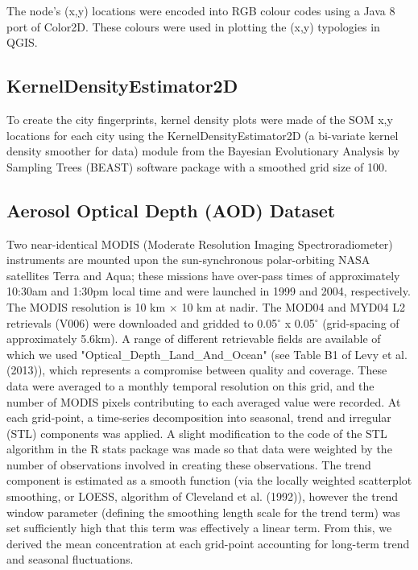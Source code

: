 \documentclass[9pt,twocolumn,twoside,lineno]{pnas-new}
\begin{document}
{%


The node's (x,y) locations were encoded into RGB colour codes using a Java 8 port of Color2D\cite{Jackle2017,Steiger2015}. These colours were used in plotting the (x,y) typologies in QGIS\cite{QGIS2009}.


\subsection*{KernelDensityEstimator2D}\label{kerneldensity}

To create the city fingerprints, kernel density plots were made of the SOM x,y locations for each city using the KernelDensityEstimator2D (a bi-variate kernel density smoother for data) module from the Bayesian Evolutionary Analysis by Sampling Trees (BEAST) software package \cite{Suchard2018} with a smoothed grid size of 100.


\subsection*{Aerosol Optical Depth (AOD) Dataset}\label{aod}
Two near-identical MODIS (Moderate Resolution Imaging Spectroradiometer) instruments are mounted upon the sun-synchronous polar-orbiting NASA satellites Terra and Aqua; these missions have over-pass times of approximately 10:30am and 1:30pm local time and were launched in 1999 and 2004, respectively. The MODIS resolution is 10 km $\times$ 10 km at nadir. The MOD04 and MYD04 L2 retrievals (V006) were downloaded and gridded to 0.05$^\circ$ x 0.05$^\circ$ (grid-spacing of approximately 5.6km). A range of different retrievable fields are available of which we used "Optical\_Depth\_Land\_And\_Ocean" (see Table B1 of Levy et al. (2013)\cite{Levy2013}), which represents a compromise between quality and coverage. These data were averaged to a monthly temporal resolution on this grid, and the number of MODIS pixels contributing to each averaged value were recorded. At each grid-point, a time-series decomposition into seasonal, trend and irregular (STL) components was applied\cite{Cleveland1990}. A slight modification to the code of the STL algorithm in the R stats package\cite{RCoreTeam2015} was made so that data were weighted by the number of observations involved in creating these observations. The trend component is estimated as a smooth function (via the locally weighted scatterplot smoothing, or LOESS, algorithm of Cleveland et al. (1992)\cite{Cleveland1992}), however the trend window parameter (defining the smoothing length scale for the trend term) was set sufficiently high that this term was effectively a linear term. From this, we derived the mean concentration at each grid-point accounting for long-term trend and seasonal fluctuations.

}
\end{document}
